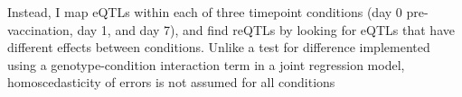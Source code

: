 Instead, I map \glspl{eQTL} within each of three timepoint conditions (day 0 pre-vaccination, day 1, and day 7), and find \glspl{reQTL} by looking for \glspl{eQTL} that have different effects between conditions.
Unlike a test for difference implemented using a genotype-condition interaction term in a joint regression model, homoscedasticity of errors is not assumed for all conditions\autocite{clogg1995StatisticalMethodsComparing}

%


